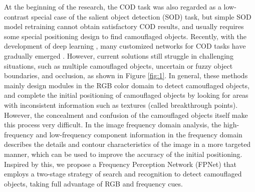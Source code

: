 \documentclass[sigconf,screen]{acmart}
\begin{document}
At the beginning of the research, the COD task was also regarded as a low-contrast special case of the salient object detection (SOD) task, but simple SOD model \cite{crm/tcsvt19/review,crm/aaai20/GCPANet,crm/tcsvt22/weaklySOD,crm/acmmm21/CDINet,crm/tcyb22/glnet,crm/tip22/CIRNet,crm/tnnls22/360SOD,crm/tetci22/PSNet,crm/acmmm21/light-field,crm/tmm22/TNet} retraining cannot obtain satisfactory COD results, and usually requires some special positioning design to find camouflaged objects.
Recently, with the development of deep learning \cite{r27,crm/access17/dsr,crm/spl21/underwater,crm/jbhi22/polyp, zhang2023controlvideo}, many customized networks for COD tasks have gradually emerged \cite{r37, r7, r16}. 
However, current solutions still struggle in challenging situations, such as multiple camouflaged objects, uncertain or fuzzy object boundaries, and occlusion, as shown in Figure \ref{fig:1}.
In general, these methods mainly design modules in the RGB color domain to detect camouflaged objects, and complete the initial positioning of camouflaged objects by looking for areas with inconsistent information such as textures (called breakthrough points). However, the concealment and confusion of the camouflaged objects itself make this process very difficult.
In the image frequency domain analysis, the high-frequency and low-frequency component information in the frequency domain describes the details and contour characteristics of the image in a more targeted manner, which can be used to improve the accuracy of the initial positioning.
Inspired by this, we propose a Frequency Perception Network (FPNet) that employs a two-stage strategy of search and recognition to detect camouflaged objects, taking full advantage of RGB and frequency cues.
\end{document}
